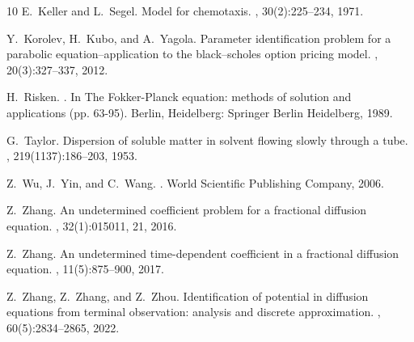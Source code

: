\documentclass[11pt]{article}
\numberwithin{equation}{section}
\begin{document}
\begin{thebibliography}{10}
E.~Keller and L.~Segel.
\newblock Model for chemotaxis.
, 30(2):225--234, 1971.

Y.~Korolev, H.~Kubo, and A.~Yagola.
\newblock Parameter identification problem for a parabolic
  equation–application to the black–scholes option pricing model.
, 20(3):327--337,
  2012.

H.~Risken.
.
\newblock In The Fokker-Planck equation: methods of solution and applications
  (pp. 63-95). Berlin, Heidelberg: Springer Berlin Heidelberg, 1989.

G.~Taylor.
\newblock Dispersion of soluble matter in solvent flowing slowly through a
  tube.
, 219(1137):186--203, 1953.

Z.~Wu, J.~Yin, and C.~Wang.
.
\newblock World Scientific Publishing Company, 2006.

Z.~Zhang.
\newblock An undetermined coefficient problem for a fractional diffusion
  equation.
, 32(1):015011, 21, 2016.

Z.~Zhang.
\newblock An undetermined time-dependent coefficient in a fractional diffusion
  equation.
, 11(5):875--900, 2017.

Z.~Zhang, Z.~Zhang, and Z.~Zhou.
\newblock Identification of potential in diffusion equations from terminal
  observation: analysis and discrete approximation.
, 60(5):2834--2865, 2022.

\end{thebibliography}
\end{document}
